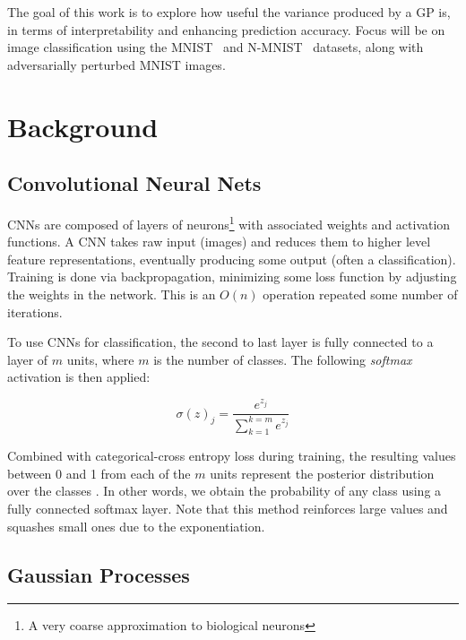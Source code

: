 \documentclass{article}
\begin{document}
The goal of this work is to explore how useful the variance produced by a GP is, in terms of interpretability and enhancing prediction accuracy. Focus will be on image classification using the MNIST~\cite{lecun1998gradient} and N-MNIST~\cite{basu2017learning} datasets, along with adversarially perturbed MNIST images.


\section{Background}
\label{sec:background}
\subsection{Convolutional Neural Nets}
\label{sec:background:cnn}
CNNs are composed of layers of neurons\footnote{A very coarse approximation to biological neurons} with associated weights and activation functions. A CNN takes raw input (images) and reduces them to higher level feature representations, eventually producing some output (often a classification). Training is done via backpropagation, minimizing some loss function by adjusting the weights in the network. This is an $O(n)$ operation repeated some number of iterations.

To use CNNs for classification, the second to last layer is fully connected to a layer of $m$ units, where $m$ is the number of classes. The following \textit{softmax} activation is then applied:

\[ \sigma(z)_j = \frac{e^{z_j}}{\sum_{k=1}^{k=m}e^{z_j}} \]

Combined with categorical-cross entropy loss during training, the resulting values between 0 and 1 from each of the $m$ units represent the posterior distribution over the classes \cite{bridle1990probabilistic}. In other words, we obtain the probability of any class using a fully connected softmax layer. Note that this method reinforces large values and squashes small ones due to the exponentiation.

\subsection{Gaussian Processes}
\label{sec:background:gp}
\end{document}
